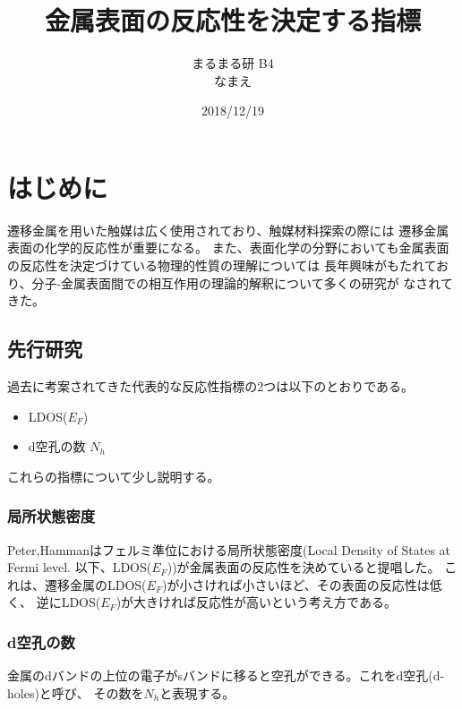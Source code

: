 \documentclass[12pt]{ltjsarticle}
\begin{document}
\begin{titlepage}
\title{金属表面の反応性を決定する指標}
\author{まるまる研 B4 \\ なまえ}
\date{2018/12/19}
\maketitle
\tableofcontents

\end{titlepage}

\section{はじめに}
遷移金属を用いた触媒は広く使用されており、触媒材料探索の際には
遷移金属表面の化学的反応性が重要になる。
また、表面化学の分野においても金属表面の反応性を決定づけている物理的性質の理解については
長年興味がもたれており、分子-金属表面間での相互作用の理論的解釈について多くの研究が
なされてきた。 \\

\subsection{先行研究}

過去に考案されてきた代表的な反応性指標の2つは以下のとおりである。

\begin{itemize}
 \item LDOS($E_F$)
 \item d空孔の数 $N_h$
\end{itemize}

これらの指標について少し説明する。

\subsubsection{局所状態密度}
Peter,Hammanはフェルミ準位における局所状態密度(Local Density of States at Fermi level.
以下、LDOS($E_F$))が金属表面の反応性を決めていると提唱した。
これは、遷移金属のLDOS($E_F$)が小さければ小さいほど、その表面の反応性は低く、
逆にLDOS($E_F$)が大きければ反応性が高いという考え方である。\cite{PeterJ.Feibelman1984}

\subsubsection{d空孔の数}
金属のdバンドの上位の電子がsバンドに移ると空孔ができる。これをd空孔(d-holes)と呼び、
その数を$N_h$と表現する。
\end{document}
